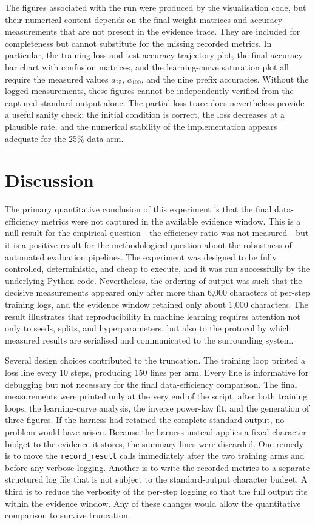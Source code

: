 \documentclass{article}
\begin{document}
The figures associated with the run were produced by the visualisation code, but their numerical content depends on the final weight matrices and accuracy measurements that are not present in the evidence trace. They are included for completeness but cannot substitute for the missing recorded metrics. In particular, the training-loss and test-accuracy trajectory plot, the final-accuracy bar chart with confusion matrices, and the learning-curve saturation plot all require the measured values \(a_{25}\), \(a_{100}\), and the nine prefix accuracies. Without the logged measurements, these figures cannot be independently verified from the captured standard output alone. The partial loss trace does nevertheless provide a useful sanity check: the initial condition is correct, the loss decreases at a plausible rate, and the numerical stability of the implementation appears adequate for the 25\%-data arm.

\section{Discussion}
\label{sec:discussion}

The primary quantitative conclusion of this experiment is that the final data-efficiency metrics were not captured in the available evidence window. This is a null result for the empirical question---the efficiency ratio was not measured---but it is a positive result for the methodological question about the robustness of automated evaluation pipelines. The experiment was designed to be fully controlled, deterministic, and cheap to execute, and it was run successfully by the underlying Python code. Nevertheless, the ordering of output was such that the decisive measurements appeared only after more than 6{,}000 characters of per-step training logs, and the evidence window retained only about 1{,}000 characters. The result illustrates that reproducibility in machine learning requires attention not only to seeds, splits, and hyperparameters, but also to the protocol by which measured results are serialised and communicated to the surrounding system.

Several design choices contributed to the truncation. The training loop printed a loss line every 10 steps, producing 150 lines per arm. Every line is informative for debugging but not necessary for the final data-efficiency comparison. The final measurements were printed only at the very end of the script, after both training loops, the learning-curve analysis, the inverse power-law fit, and the generation of three figures. If the harness had retained the complete standard output, no problem would have arisen. Because the harness instead applies a fixed character budget to the evidence it stores, the summary lines were discarded. One remedy is to move the \texttt{record\_result} calls immediately after the two training arms and before any verbose logging. Another is to write the recorded metrics to a separate structured log file that is not subject to the standard-output character budget. A third is to reduce the verbosity of the per-step logging so that the full output fits within the evidence window. Any of these changes would allow the quantitative comparison to survive truncation.
\end{document}

